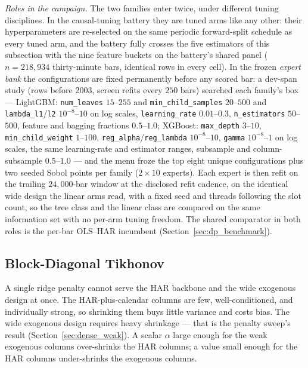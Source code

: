 \emph{Roles in the campaign.} The two families enter twice, under
different tuning disciplines. In the causal-tuning battery they are
tuned arms like any other: their hyperparameters are re-selected on the
same periodic forward-split schedule as every tuned arm, and the battery
fully crosses the five estimators of this subsection with the nine
feature buckets on the battery's shared panel ($n = 218{,}934$
thirty-minute bars, identical rows in every cell). In the frozen
\emph{expert bank} the configurations are fixed permanently before any
scored bar: a dev-span study (rows before 2003, screen refits every
$250$ bars) searched each family's box --- LightGBM:
\texttt{num\_leaves} $15$--$255$ and \texttt{min\_child\_samples}
$20$--$500$ and \texttt{lambda\_l1}/\texttt{l2} $10^{-8}$--$10$ on log
scales, \texttt{learning\_rate} $0.01$--$0.3$,
\texttt{n\_estimators} $50$--$500$, feature and bagging fractions
$0.5$--$1.0$; XGBoost: \texttt{max\_depth} $3$--$10$,
\texttt{min\_child\_weight} $1$--$100$,
\texttt{reg\_alpha}/\texttt{reg\_lambda} $10^{-8}$--$10$,
\texttt{gamma} $10^{-8}$--$1$ on log scales, the same learning-rate and
estimator ranges, subsample and column-subsample $0.5$--$1.0$ --- and
the menu froze the top eight unique configurations plus two seeded Sobol
points per family ($2 \times 10$ experts). Each expert is then refit on
the trailing $24{,}000$-bar window at the disclosed refit cadence, on
the identical wide design the linear arms read, with a fixed seed and
threads following the slot count, so the tree class and the linear
class are compared on the same information set with no per-arm tuning
freedom. The shared comparator in both roles is the per-bar OLS--HAR
incumbent (Section~\ref{sec:dp_benchmark}).

\subsection{Block-Diagonal Tikhonov}
\label{sec:block_tikhonov}
\label{sec:hierarchical_ridge}
\label{sec:dense_weak_twoblock}
\label{sec:three_block}

A single ridge penalty cannot serve the HAR backbone and the wide
exogenous design at once. The HAR-plus-calendar columns are few,
well-conditioned, and individually strong, so shrinking them buys
little variance and costs bias. The wide exogenous design requires
heavy shrinkage --- that is the penalty sweep's result
(Section~\ref{sec:dense_weak}). A scalar $\alpha$ large enough for the weak
exogenous columns over-shrinks the HAR columns; a value small enough
for the HAR columns under-shrinks the exogenous columns.

